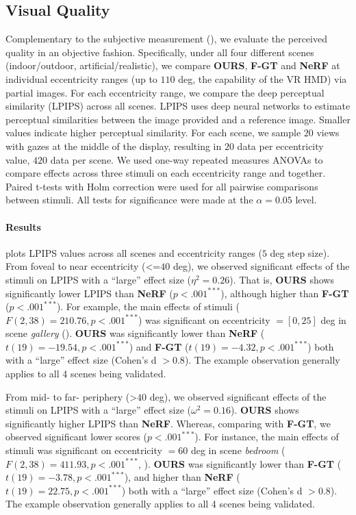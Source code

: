 \subsection{Visual Quality}
\label{sec:study:quality}

Complementary to the subjective measurement (), we evaluate the perceived quality in an objective fashion. Specifically, under all four different scenes (indoor/outdoor, artificial/realistic), we compare {\bf OURS}, {\bf F-GT} and {\bf NeRF} at individual eccentricity ranges (up to $110$ deg, the capability of the VR HMD) via partial images. 
For each eccentricity range, we compare the deep perceptual similarity (LPIPS) \cite{zhang2018unreasonable} across all scenes. LPIPS uses deep neural networks to estimate perceptual similarities between the image provided and a reference image. Smaller values indicate higher perceptual similarity.
For each scene, we sample $20$ views with gazes at the middle of the display, resulting in $20$ data per eccentricity value, $420$ data per scene. We used one-way repeated measures ANOVAs to compare effects across three stimuli on each eccentricity range and together. Paired t-tests with Holm correction were used for all pairwise comparisons between stimuli. All tests for significance were made at the $\alpha=0.05$ level. 

\paragraph{Results} 
 plots LPIPS values across all scenes and eccentricity ranges ($5$ deg step size). 
From foveal to near eccentricity (<=$40$ deg), we observed significant effects of the stimuli on LPIPS with a ``large'' effect size ($\eta^2 = 0.26$). That is, \textbf{OURS} shows significantly lower LPIPS than \textbf{NeRF} ($p<.001^{***}$), although higher than \textbf{F-GT} ($p<.001^{***}$).
For example, the main effects of stimuli ($F(2,38)=210.76, p<.001^{***}$) was significant on eccentricity $=[0,25]$ deg in scene \textit{gallery} (). \textbf{OURS} was significantly lower than \textbf{NeRF} ($t(19)=-19.54, p<.001^{***}$) and \textbf{F-GT} ($t(19)=-4.32, p<.001^{***}$) both with a ``large'' effect size (Cohen's d $>0.8$). The example observation generally applies to all 4 scenes being validated. 

From mid- to far- periphery (>$40$ deg), we observed significant effects of the stimuli on LPIPS with a ``large'' effect size ($\omega^2 = 0.16$). \textbf{OURS} shows significantly higher LPIPS than \textbf{NeRF}. Whereas, comparing with \textbf{F-GT}, we observed significant lower scores ($p<.001^{***}$).
For instance, the main effects of stimuli was significant on eccentricity $=60$ deg in scene \textit{bedroom} ($F(2,38)=411.93, p<.001^{***}$, ). \textbf{OURS} was significantly lower than \textbf{F-GT} ($t(19)=-3.78, p<.001^{***}$), and higher than \textbf{NeRF} ($t(19)=22.75, p<.001^{***}$) both with a ``large'' effect size (Cohen's d $>0.8$). The example observation generally applies to all 4 scenes being validated. 

